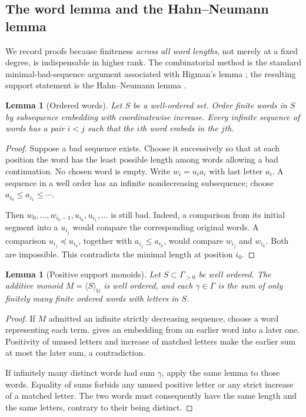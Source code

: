 \documentclass[11pt,letterpaper]{article}
\numberwithin{equation}{section}
\newtheorem{lemma}[theorem]{Lemma}
\theoremstyle{definition}
\theoremstyle{remark}
\newcommand{\N}{\mathbb N}
\newcommand{\ang}[1]{\langle#1\rangle}
\begin{document}
\subsection{The word lemma and the Hahn--Neumann lemma}

We record proofs because finiteness \emph{across all word lengths}, not merely
at a fixed degree, is indispensable in higher rank. The combinatorial method
is the standard minimal-bad-sequence argument associated with Higman's lemma
\cite{Higman}; the resulting support statement is the Hahn--Neumann lemma
\cite{Neumann}.

\begin{lemma}[Ordered words]\label{lem:words}
Let $S$ be a well-ordered set. Order finite words in $S$ by subsequence
embedding with coordinatewise increase. Every infinite sequence of words has
a pair $i<j$ such that the $i$th word embeds in the $j$th.
\end{lemma}
\begin{proof}
Suppose a bad sequence exists. Choose it successively so that at each position
the word has the least possible length among words allowing a bad
continuation. No chosen word is empty. Write $w_i=u_i a_i$ with last letter
$a_i$. A sequence in a well order has an infinite nondecreasing subsequence;
choose $a_{i_0}\le a_{i_1}\le\cdots$.

Then $w_0,\ldots,w_{i_0-1},u_{i_0},u_{i_1},\ldots$ is still bad. Indeed, a
comparison from its initial segment into a $u_{i_j}$ would compare the
corresponding original words. A comparison $u_{i_j}\preceq u_{i_k}$, together
with $a_{i_j}\le a_{i_k}$, would compare $w_{i_j}$ and $w_{i_k}$. Both are
impossible. This contradicts the minimal length at position $i_0$.
\end{proof}

\begin{lemma}[Positive support monoids]\label{lem:neumann}
Let $S\subset\Gamma_{>0}$ be well ordered. The additive monoid
$M=\ang{S}_{\N}$ is well ordered, and each $\gamma\in\Gamma$ is the sum of
only finitely many finite ordered words with letters in $S$.
\end{lemma}
\begin{proof}
If $M$ admitted an infinite strictly decreasing sequence, choose a word
representing each term.  gives an embedding from an earlier
word into a later one. Positivity of unused letters and increase of matched
letters make the earlier sum at most the later sum, a contradiction.

If infinitely many distinct words had sum $\gamma$, apply the same lemma to
those words. Equality of sums forbids any unused positive letter or any
strict increase of a matched letter. The two words must consequently have
the same length and the same letters, contrary to their being distinct.
\end{proof}
\end{document}
